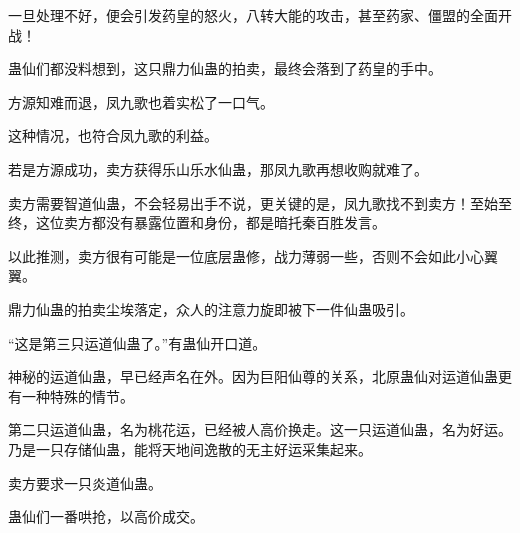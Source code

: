 \begin{this_body}
一旦处理不好，便会引发药皇的怒火，八转大能的攻击，甚至药家、僵盟的全面开战！

蛊仙们都没料想到，这只鼎力仙蛊的拍卖，最终会落到了药皇的手中。

方源知难而退，凤九歌也着实松了一口气。

这种情况，也符合凤九歌的利益。

若是方源成功，卖方获得乐山乐水仙蛊，那凤九歌再想收购就难了。

卖方需要智道仙蛊，不会轻易出手不说，更关键的是，凤九歌找不到卖方！至始至终，这位卖方都没有暴露位置和身份，都是暗托秦百胜发言。

以此推测，卖方很有可能是一位底层蛊修，战力薄弱一些，否则不会如此小心翼翼。

鼎力仙蛊的拍卖尘埃落定，众人的注意力旋即被下一件仙蛊吸引。

“这是第三只运道仙蛊了。”有蛊仙开口道。

神秘的运道仙蛊，早已经声名在外。因为巨阳仙尊的关系，北原蛊仙对运道仙蛊更有一种特殊的情节。

第二只运道仙蛊，名为桃花运，已经被人高价换走。这一只运道仙蛊，名为好运。乃是一只存储仙蛊，能将天地间逸散的无主好运采集起来。

卖方要求一只炎道仙蛊。

蛊仙们一番哄抢，以高价成交。

\end{this_body}

